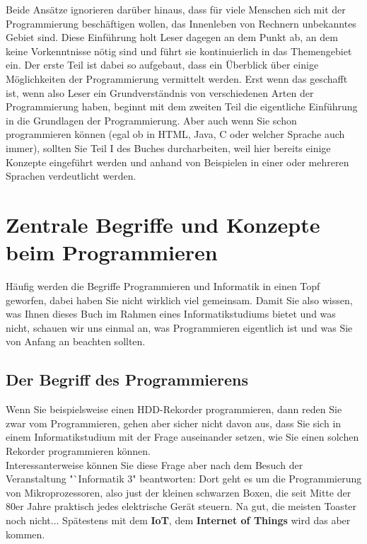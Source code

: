 Beide Ansätze ignorieren darüber hinaus, dass für viele Menschen sich mit der Programmierung beschäftigen wollen, das Innenleben von Rechnern unbekanntes Gebiet sind. Diese Einführung holt Leser dagegen an dem Punkt ab, an dem keine Vorkenntnisse nötig sind und führt sie kontinuierlich in das Themengebiet ein. Der erste Teil ist dabei so aufgebaut, dass ein Überblick über einige Möglichkeiten der Programmierung vermittelt werden. Erst wenn das geschafft ist, wenn also Leser ein Grundverständnis von verschiedenen Arten der Programmierung haben, beginnt mit dem zweiten Teil die eigentliche Einführung in die Grundlagen der Programmierung. Aber auch wenn Sie schon programmieren können (egal ob in HTML, Java, C oder welcher Sprache auch immer), sollten Sie Teil I des Buches durcharbeiten, weil hier bereits einige Konzepte eingeführt werden und anhand von Beispielen in einer oder mehreren Sprachen verdeutlicht werden.

\section{Zentrale Begriffe und Konzepte beim Programmieren}

Häufig werden die Begriffe Programmieren und Informatik in einen Topf geworfen, dabei haben Sie nicht wirklich viel gemeinsam. Damit Sie also wissen, was Ihnen dieses Buch im Rahmen eines Informatikstudiums bietet und was nicht, schauen wir uns einmal an, was Programmieren eigentlich ist und was Sie von Anfang an beachten sollten.

\subsection{Der Begriff des Programmierens}

Wenn Sie beispielsweise einen HDD-Rekorder programmieren, dann reden Sie zwar vom Programmieren,  gehen aber sicher nicht davon aus, dass Sie sich in einem Informatikstudium mit der Frage auseinander setzen, wie Sie einen solchen Rekorder programmieren können.\\

Interessanterweise können Sie diese Frage aber nach dem Besuch der Veranstaltung "`Informatik 3"  beantworten: Dort geht es um die Programmierung von Mikroprozessoren, also just der kleinen schwarzen Boxen, die seit Mitte der 80er Jahre praktisch jedes elektrische Gerät steuern. Na gut, die meisten Toaster noch nicht... Spätestens mit dem \textbf{IoT}, dem \textbf{Internet of Things} wird das aber kommen.\\

